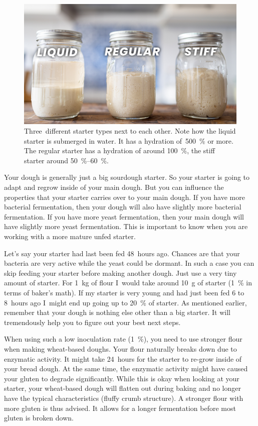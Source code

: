 \begin{figure}[!htb]
  \includegraphics[width=\textwidth]{sourdough-starter-types}
  \caption[Liquid, regular and stiff starter]{Three~different starter types
      next to each other. Note how the liquid starter is submerged in water.
      It has a hydration of~\qty{500}{\percent} or more.  The regular starter
      has a hydration of around \qty{100}{\percent}, the stiff starter around
      \qtyrange{50}{60}{\percent}.}%
  \label{fig:starter-types}
\end{figure}

Your dough is generally just a big sourdough starter. So your starter is going
to adapt and regrow inside of your main dough. But you can influence the
properties that your starter carries over to your main dough. If you have more
bacterial fermentation, then your dough will also have slightly more bacterial
fermentation. If you have more yeast fermentation, then your main dough will
have slightly more yeast fermentation. This is important to know when you are
working with a more mature unfed starter.

Let's say your starter had last been
fed 48~hours ago. Chances are that your bacteria are very active while the
yeast could be dormant. In such a case you can skip feeding your starter
before making another dough. Just use a very tiny amount of starter. For
\qty{1}{\kg} of flour I~would take around \qty{10}{\gram} of starter
(\qty{1}{\percent} in terms of baker's
math). If my starter is very young and had just been fed 6 to 8~hours ago I~might
end up going up to \qty{20}{\percent} of starter. As mentioned earlier,
remember that your dough is nothing
else other than a big starter. It will tremendously help you to figure out
your best next steps.

When using such a low inoculation rate (\qty{1}{\percent}), you need to use stronger
flour when making wheat-based doughs. Your flour naturally breaks down due
to enzymatic activity. It might take 24~hours for the starter to re-grow
inside of your bread dough. At the same time, the enzymatic activity might
have caused your gluten to degrade significantly. While this is okay
when looking at your starter, your wheat-based dough will flatten
out during baking and no longer have the typical characteristics (fluffy crumb
structure). A stronger flour with more gluten is thus advised. It allows for
a longer fermentation before most gluten is broken down.

